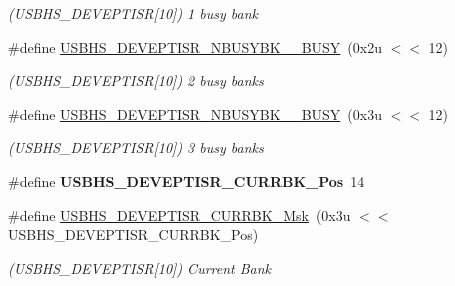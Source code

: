 \begin{DoxyCompactItemize}
\begin{DoxyCompactList}\small\item\em (U\+S\+B\+H\+S\+\_\+\+D\+E\+V\+E\+P\+T\+I\+SR\mbox{[}10\mbox{]}) 1 busy bank \end{DoxyCompactList}\item 
\mbox{\label{group__SAMV71__USBHS_gad73f58e4156b8dd35070b4a14408aa20}} 
\#define \mbox{\hyperlink{group__SAMV71__USBHS_gad73f58e4156b8dd35070b4a14408aa20}{U\+S\+B\+H\+S\+\_\+\+D\+E\+V\+E\+P\+T\+I\+S\+R\+\_\+\+N\+B\+U\+S\+Y\+B\+K\+\_\+\_\+\+B\+U\+SY}}~(0x2u $<$$<$ 12)
\begin{DoxyCompactList}\small\item\em (U\+S\+B\+H\+S\+\_\+\+D\+E\+V\+E\+P\+T\+I\+SR\mbox{[}10\mbox{]}) 2 busy banks \end{DoxyCompactList}\item 
\mbox{\label{group__SAMV71__USBHS_gaa39743799ddb041a3cb76d050d638892}} 
\#define \mbox{\hyperlink{group__SAMV71__USBHS_gaa39743799ddb041a3cb76d050d638892}{U\+S\+B\+H\+S\+\_\+\+D\+E\+V\+E\+P\+T\+I\+S\+R\+\_\+\+N\+B\+U\+S\+Y\+B\+K\+\_\+\_\+\+B\+U\+SY}}~(0x3u $<$$<$ 12)
\begin{DoxyCompactList}\small\item\em (U\+S\+B\+H\+S\+\_\+\+D\+E\+V\+E\+P\+T\+I\+SR\mbox{[}10\mbox{]}) 3 busy banks \end{DoxyCompactList}\item 
\mbox{\label{group__SAMV71__USBHS_gaf1040327b8d8ee4bfc63394aa1f9b0d7}} 
\#define {\bfseries U\+S\+B\+H\+S\+\_\+\+D\+E\+V\+E\+P\+T\+I\+S\+R\+\_\+\+C\+U\+R\+R\+B\+K\+\_\+\+Pos}~14
\item 
\mbox{\label{group__SAMV71__USBHS_ga7c73d2b3727580bd7efba8f42386146a}} 
\#define \mbox{\hyperlink{group__SAMV71__USBHS_ga7c73d2b3727580bd7efba8f42386146a}{U\+S\+B\+H\+S\+\_\+\+D\+E\+V\+E\+P\+T\+I\+S\+R\+\_\+\+C\+U\+R\+R\+B\+K\+\_\+\+Msk}}~(0x3u $<$$<$ U\+S\+B\+H\+S\+\_\+\+D\+E\+V\+E\+P\+T\+I\+S\+R\+\_\+\+C\+U\+R\+R\+B\+K\+\_\+\+Pos)
\begin{DoxyCompactList}\small\item\em (U\+S\+B\+H\+S\+\_\+\+D\+E\+V\+E\+P\+T\+I\+SR\mbox{[}10\mbox{]}) Current Bank \end{DoxyCompactList}\item 
\mbox{\label{group__SAMV71__USBHS_ga69452e2ef35a964e9d9565a530992986}} 
$$
\end{DoxyCompactItemize}

